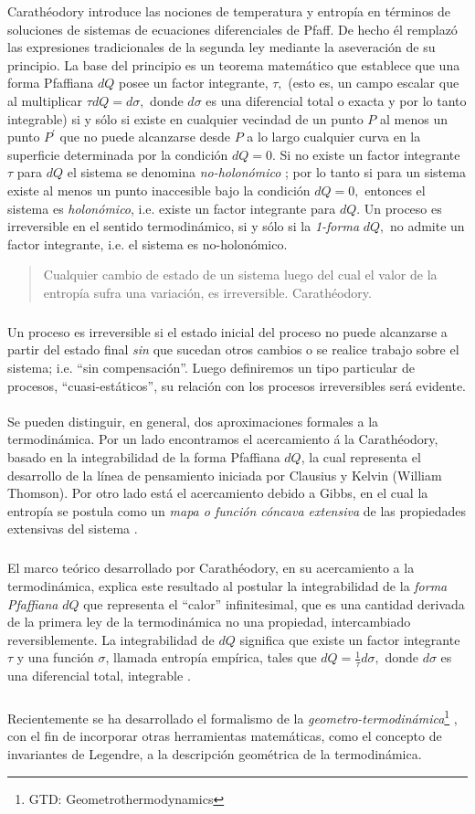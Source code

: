 \documentclass{article}
\theoremstyle{definition} \newtheorem{defi}{Definici\'on}
\theoremstyle{definition} \newtheorem{teo}{Teorema}
\theoremstyle{definition} \newtheorem{cor}{Corolario}
\begin{document}
Carath\'eodory introduce las nociones de temperatura y entrop\'ia en t\'erminos de soluciones de sistemas de ecuaciones diferenciales de Pfaff. De hecho \'el remplaz\'o las expresiones tradicionales de la segunda ley mediante la aseveraci\'on de su principio. La base del principio es un teorema matem\'atico que establece que una forma Pfaffiana $dQ$ posee un factor integrante, $\tau,$ (esto es, un campo escalar que al multiplicar $\tau dQ=d\sigma,$ donde $d\sigma$ es una diferencial total o exacta y por lo tanto integrable) si y s\'olo si existe en cualquier vecindad de un punto $P$ al menos un punto $P^{\prime}$ que no puede alcanzarse desde $P$ a lo largo cualquier curva en la superficie determinada por la condici\'on $dQ=0.$ Si no existe un factor integrante $\tau$ para $dQ$ el sistema se denomina \emph{no-holon\'omico} \cite{KR}; por lo tanto si para un sistema existe al menos un punto inaccesible bajo la condici\'on $dQ=0,$ entonces el sistema es \emph{holon\'omico}, i.e. existe un factor integrante para $dQ$. Un proceso es irreversible en el sentido termodin\'amico, si y s\'olo si la \emph{1-forma} $dQ,$ no admite un factor integrante, i.e. el sistema es no-holon\'omico.
\begin{quote}
Cualquier cambio de estado de un sistema luego del cual el valor de la entrop\'ia sufra una variaci\'on, es irreversible. Carath\'eodory.
\end{quote}
\subparagraph{}
Un proceso es irreversible si el estado inicial del proceso no puede alcanzarse a partir del estado final \emph{sin} que sucedan otros cambios o se realice trabajo sobre el sistema; i.e. ``sin compensaci\'on''. Luego definiremos un tipo particular de procesos, ``cuasi-est\'aticos'', su relaci\'on con los procesos irreversibles ser\'a evidente.
\paragraph{}
Se pueden distinguir, en general, dos aproximaciones formales a la termodin\'amica. Por un lado encontramos el acercamiento \'a la Carath\'eodory, basado en la integrabilidad de la forma Pfaffiana $dQ$, la cual representa el desarrollo de la l\'inea de pensamiento iniciada por Clausius y Kelvin (William Thomson). Por otro lado est\'a el acercamiento debido a Gibbs, en el cual la entrop\'ia se postula como un \emph{mapa o funci\'on c\'oncava extensiva} de las propiedades extensivas del sistema \cite{CG}.
\subparagraph{}
El marco te\'orico desarrollado por Carath\'eodory, en su acercamiento a la termodin\'amica, explica este resultado al postular la integrabilidad de la \emph{forma Pfaffiana} $dQ$ que representa el ``calor'' infinitesimal, que es una cantidad derivada de la primera ley de la termodin\'amica no una propiedad, intercambiado reversiblemente. La integrabilidad de $dQ$ significa que existe un factor integrante $\tau$ y una funci\'on $\sigma$, llamada entrop\'ia emp\'irica, tales que $dQ=\frac{1}{\tau} d\sigma,$ donde $d\sigma$ es una diferencial total, integrable \cite{bh}.
\subparagraph{}
Recientemente se ha desarrollado el formalismo de la \emph{geometro-termodin\'amica}\footnote{GTD: Geometrothermodynamics} \cite{gtd}, con el fin de incorporar otras herramientas matem\'aticas, como el concepto de invariantes de Legendre, a la descripci\'on geom\'etrica de la termodin\'amica.
\end{document}
